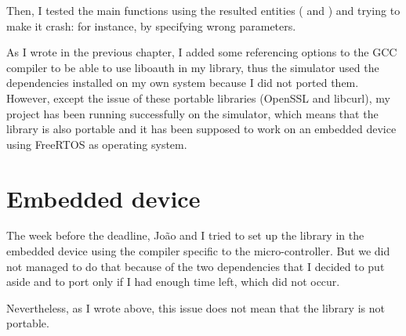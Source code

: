 Then, I tested the main functions using the resulted entities ( and ) and trying to make it crash: for instance, by specifying wrong parameters.

As I wrote in the previous chapter, I added some referencing options to the GCC compiler to be able to use liboauth in my library, thus the simulator used the dependencies installed on my own system because I did not ported them. However, except the issue of these portable libraries (OpenSSL and libcurl), my project has been running successfully on the simulator, which means that the library is also portable and it has been supposed to work on an embedded device using FreeRTOS as operating system.


\section{Embedded device }

\hspace{15mm}The week before the deadline, Jo\~{a}o and I tried to set up the library in the embedded device using the compiler specific to the micro-controller. But we did not managed to do that because of the two dependencies that I decided to put aside and to port only if I had enough time left, which did not occur.

Nevertheless, as I wrote above, this issue does not mean that the library is not portable.



\clearpage
